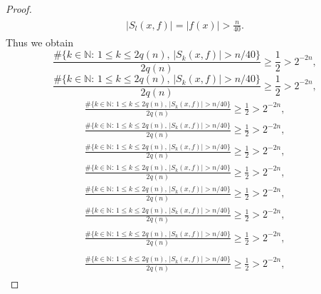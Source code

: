 \documentclass{amsart}
\numberwithin{equation}{section}
\begin{document}
\begin{proof}
{\begin{multline}
\begin{split}
|S_l(x,f)|=|f(x)|> \frac{n}{40}.
\end{split}\end{multline}\fi
}
Thus we obtain
{
\begin{equation*} 
\frac{\#\{k\in {\ensuremath{\mathbb N}}:\,1\le k\le 2q(n),\, |S_k(x,f)|>n/40 \}}{2q(n)}\ge \frac{1}{2}> 2^{-2n},
 \end{equation*}\fi  
{}\begin{equation}
\frac{\#\{k\in {\ensuremath{\mathbb N}}:\,1\le k\le 2q(n),\, |S_k(x,f)|>n/40 \}}{2q(n)}\ge \frac{1}{2}> 2^{-2n},
\end{equation}\fi   
{}\begin{align*}
\frac{\#\{k\in {\ensuremath{\mathbb N}}:\,1\le k\le 2q(n),\, |S_k(x,f)|>n/40 \}}{2q(n)}\ge \frac{1}{2}> 2^{-2n},
\end{align*}\fi   
{}\begin{align}
\frac{\#\{k\in {\ensuremath{\mathbb N}}:\,1\le k\le 2q(n),\, |S_k(x,f)|>n/40 \}}{2q(n)}\ge \frac{1}{2}> 2^{-2n},
\end{align}\fi    
{}\begin{gather*}
\frac{\#\{k\in {\ensuremath{\mathbb N}}:\,1\le k\le 2q(n),\, |S_k(x,f)|>n/40 \}}{2q(n)}\ge \frac{1}{2}> 2^{-2n},
\end{gather*}\fi  
{}\begin{gather}
\frac{\#\{k\in {\ensuremath{\mathbb N}}:\,1\le k\le 2q(n),\, |S_k(x,f)|>n/40 \}}{2q(n)}\ge \frac{1}{2}> 2^{-2n},
\end{gather}\fi   
{}\begin{multline*}
\frac{\#\{k\in {\ensuremath{\mathbb N}}:\,1\le k\le 2q(n),\, |S_k(x,f)|>n/40 \}}{2q(n)}\ge \frac{1}{2}> 2^{-2n},
\end{multline*}\fi  
{}\begin{multline}
\frac{\#\{k\in {\ensuremath{\mathbb N}}:\,1\le k\le 2q(n),\, |S_k(x,f)|>n/40 \}}{2q(n)}\ge \frac{1}{2}> 2^{-2n},
\end{multline}\fi  
{}\begin{multline*}\begin{split}
\frac{\#\{k\in {\ensuremath{\mathbb N}}:\,1\le k\le 2q(n),\, |S_k(x,f)|>n/40 \}}{2q(n)}\ge \frac{1}{2}> 2^{-2n},
\end{split}\end{multline*}\fi
{}\begin{multline}\begin{split}
\frac{\#\{k\in {\ensuremath{\mathbb N}}:\,1\le k\le 2q(n),\, |S_k(x,f)|>n/40 \}}{2q(n)}\ge \frac{1}{2}> 2^{-2n},

\end{split}
\end{multline}}
\end{proof}
\end{document}
